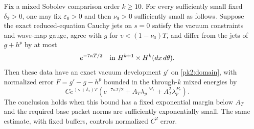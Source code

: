 \begin{proposition}
\label{pk2:deep-proposition}
Fix a mixed Sobolev comparison order $k\ge10$. For every sufficiently
small fixed $\delta_2>0$, one may fix $\varepsilon_0>0$ and then
$\nu_0>0$ sufficiently small as follows. Suppose the exact
reduced-equation Cauchy jets on $s=0$ satisfy the vacuum constraints
and wave-map gauge, agree with $g$ for $v<(1-\nu_0)T$, and differ
from the jets of $g+h^p$ by at most
\begin{equation}
 e^{-7\kappa T/2}
 \quad\hbox{in }H^{k+1}\times H^k(dx\,d\theta).
 \label{pk2:entry-accuracy}
\end{equation}
Then these data have an exact vacuum development $g'$ on
\eqref{pk2:domain}, with normalized error
$F=g'-g-h^p$ bounded in the through-$k$ mixed energies by
\begin{equation}
 C e^{(\kappa+\delta_2)T}
 \left(e^{-7\kappa T/2}+A_T\lambda_p^{-M_1}
                         +A_T^2\lambda_p^{P_*}\right).
 \tag{P7}\label{pk2:deep-error}
\end{equation}
The conclusion holds when this bound has a fixed exponential margin
below $A_T$ and the required base packet norms are sufficiently
exponentially small. The same estimate, with fixed buffers, controls
normalized $C^2$ error.
\end{proposition}
